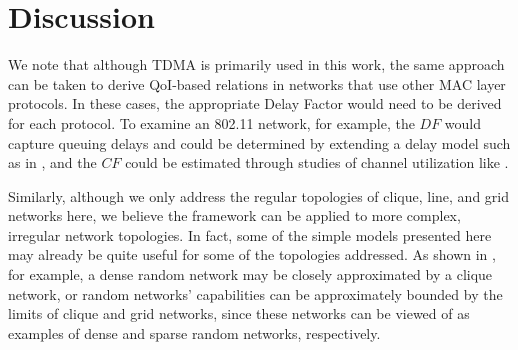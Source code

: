 \section{Discussion}
\label{sec:discussion}


We note that although TDMA is primarily used in this work, the same approach can be taken to derive QoI-based relations in networks that use other MAC layer protocols.  In these cases, the appropriate Delay Factor would need to be derived for each protocol.  To examine an 802.11 network, for example, the $DF$ would capture queuing delays and could be determined by extending a delay model such as in \cite{perf_anal_80211_lan_mac}, and the $CF$ could be estimated through studies of channel utilization like \cite{CSMA_efficiency}.  

Similarly, although we only address the regular topologies of clique, line, and grid networks here, we believe the framework can be applied to more complex, irregular network topologies.  In fact, some of the simple models presented here may already be quite useful for some of the topologies addressed.  As shown in \cite{symptotics_tech_report}, for example, a dense random network may be closely approximated by a clique network, or random networks' capabilities can be approximately bounded by the limits of clique and grid networks, since these networks can be viewed of as examples of dense and sparse random networks, respectively.  


